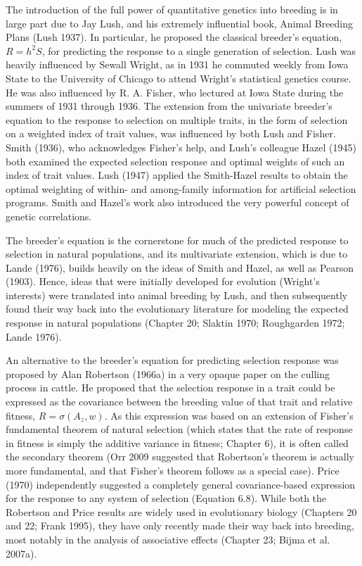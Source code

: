 \documentclass{article}
\begin{document}
The introduction of the full power of quantitative genetics into breeding is in large part due to Jay Lush, and his extremely influential book, Animal Breeding Plans (Lush 1937). In particular, he proposed the classical breeder's equation,  $ R = h^{2}S $, for predicting the response to a single generation of selection. Lush was heavily influenced by Sewall Wright, as in 1931 he commuted weekly from Iowa State to the University of Chicago to attend Wright's statistical genetics course. He was also influenced by R. A. Fisher, who lectured at Iowa State during the summers of 1931 through 1936. The extension from the univariate breeder's equation to the response to selection on multiple traits, in the form of selection on a weighted index of trait values, was influenced by both Lush and Fisher. Smith (1936), who acknowledges Fisher's help, and Lush's colleague Hazel (1945) both examined the expected selection response and optimal weights of such an index of trait values. Lush (1947) applied the Smith-Hazel results to obtain the optimal weighting of within- and among-family information for artificial selection programs. Smith and Hazel's work also introduced the very powerful concept of genetic correlations.

The breeder’s equation is the cornerstone for much of the predicted response to selection in natural populations, and its multivariate extension, which is due to Lande (1976), builds heavily on the ideas of Smith and Hazel, as well as Pearson (1903). Hence, ideas that were initially developed for evolution (Wright’s interests) were translated into animal breeding by Lush, and then subsequently found their way back into the evolutionary literature for modeling the expected response in natural populations (Chapter 20; Slaktin 1970; Roughgarden 1972; Lande 1976).

An alternative to the breeder’s equation for predicting selection response was proposed by Alan Robertson (1966a) in a very opaque paper on the culling process in cattle. He proposed that the selection response in a trait could be expressed as the covariance between the breeding value of that trait and relative fitness,  $ R = \sigma(A_z, w) $. As this expression was based on an extension of Fisher’s fundamental theorem of natural selection (which states that the rate of response in fitness is simply the additive variance in fitness; Chapter 6), it is often called the secondary theorem (Orr 2009 suggested that Robertson’s theorem is actually more fundamental, and that Fisher’s theorem follows as a special case). Price (1970) independently suggested a completely general covariance-based expression for the response to any system of selection (Equation 6.8). While both the Robertson and Price results are widely used in evolutionary biology (Chapters 20 and 22; Frank 1995), they have only recently made their way back into breeding, most notably in the analysis of associative effects (Chapter 23; Bijma et al. 2007a).
\end{document}
